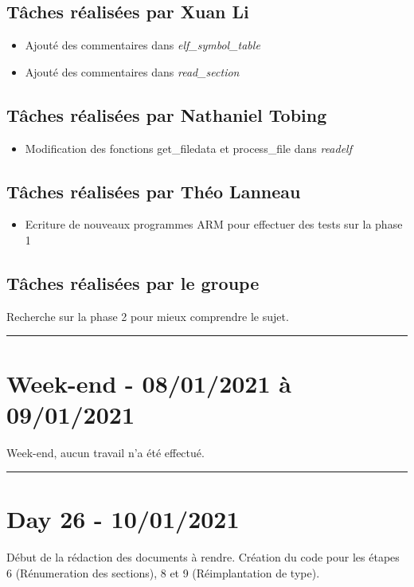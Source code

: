 \documentclass[11pt,letterpaper]{article}
\begin{document}
\subsection*{Tâches réalisées par Xuan Li}
\begin{itemize}
    \item Ajouté des commentaires dans \textit{elf\_symbol\_table}
    \item Ajouté des commentaires dans \textit{read\_section}
\end{itemize}

\subsection*{Tâches réalisées par Nathaniel Tobing}
\begin{itemize}
    \item Modification des fonctions get\_filedata et process\_file dans \textit{readelf}
\end{itemize}

\subsection*{Tâches réalisées par Théo Lanneau}
\begin{itemize}
    \item Ecriture de nouveaux programmes ARM pour effectuer des tests sur la phase 1
\end{itemize}

\subsection*{Tâches réalisées par le groupe}
Recherche sur la phase 2 pour mieux comprendre le sujet.

\noindent\rule{13cm}{0.4pt}

\section*{Week-end - 08/01/2021 à 09/01/2021}

Week-end, aucun travail n'a été effectué.

\noindent\rule{13cm}{0.4pt}

\section*{Day 26 - 10/01/2021}
Début de la rédaction des documents à rendre.
Création du code pour les étapes 6 (Rénumeration des sections), 8 et 9 
(Réimplantation de type).
\end{document}
